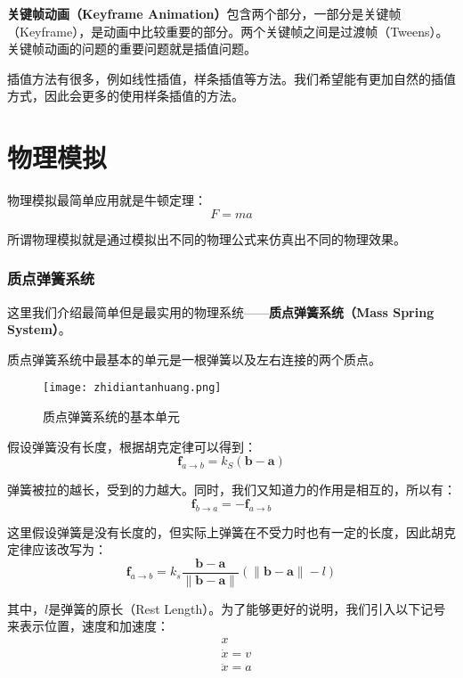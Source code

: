 \documentclass[openany]{progbookcn}
\begin{document}
\textbf{关键帧动画（Keyframe Animation）}包含两个部分，一部分是关键帧（Keyframe），是动画中比较重要的部分。两个关键帧之间是过渡帧（Tweens）。关键帧动画的问题的重要问题就是插值问题。

插值方法有很多，例如线性插值，样条插值等方法。我们希望能有更加自然的插值方式，因此会更多的使用样条插值的方法。

\section{物理模拟}

物理模拟最简单应用就是牛顿定理：
\begin{equation}
	F=ma
\end{equation}

所谓物理模拟就是通过模拟出不同的物理公式来仿真出不同的物理效果。

\subsubsection{质点弹簧系统}

这里我们介绍最简单但是最实用的物理系统——\textbf{质点弹簧系统（Mass Spring System）}。

质点弹簧系统中最基本的单元是一根弹簧以及左右连接的两个质点。

\begin{figure}[H]
	\centering
	\texttt{[image: zhidiantanhuang.png]}
	\caption{质点弹簧系统的基本单元}
	\label{fig:zdth}
\end{figure}

假设弹簧没有长度，根据胡克定律可以得到：
\begin{equation}
	\mathbf{f}_{a \rightarrow b}=k_{S}(\mathbf{b}-\mathbf{a})
\end{equation}

弹簧被拉的越长，受到的力越大。同时，我们又知道力的作用是相互的，所以有：
\begin{equation}
	\mathbf{f}_{b \rightarrow a}=-\mathbf{f}_{a \rightarrow b}
\end{equation}

这里假设弹簧是没有长度的，但实际上弹簧在不受力时也有一定的长度，因此胡克定律应该改写为：
\begin{equation}
	\mathbf{f}_{a \rightarrow b}=k_{s} \frac{\mathbf{b}-\mathbf{a}}{\|\mathbf{b}-\mathbf{a}\|}(\|\mathbf{b}-\mathbf{a}\|-l)
\end{equation}

其中，$l$是弹簧的原长（Rest Length）。为了能够更好的说明，我们引入以下记号来表示位置，速度和加速度：
\begin{equation}
	\begin{split}
	&	x \\
	&	\dot{x}=v \\
	&	\ddot{x}=a
	\end{split}
\end{equation}
\end{document}
